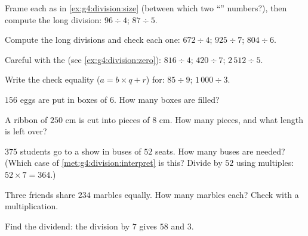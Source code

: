 \begin{exercise}[$\star$]\label{exo:g4:division:1}
Frame each  as in \cref{ex:g4:division:size} (between which
two ``'' numbers?), then compute the long division:
$96 \div 4$; \quad $87 \div 5$.
\end{exercise}

\begin{exercise}[$\star$]\label{exo:g4:division:2}
Compute the long divisions and check each one:
$672 \div 4$; \quad $925 \div 7$; \quad $804 \div 6$.
\end{exercise}

\begin{exercise}[$\star$]\label{exo:g4:division:3}
Careful with the  (see \cref{ex:g4:division:zero}):
$816 \div 4$; \quad $420 \div 7$; \quad $2\,512 \div 5$.
\end{exercise}

\begin{exercise}[$\star$]\label{exo:g4:division:4}
Write the check equality ($a = b \times q + r$) for: $85 \div 9$;
\quad $1\,000 \div 3$.
\end{exercise}

\begin{exercise}[$\star$]\label{exo:g4:division:5}
$156$ eggs are put in boxes of $6$. How many boxes are filled?
\end{exercise}

\begin{exercise}[$\star$]\label{exo:g4:division:6}
A ribbon of $250$ cm is cut into pieces of $8$ cm. How many pieces,
and what length is left over?
\end{exercise}

\begin{exercise}[$\star$]\label{exo:g4:division:7}
$375$ students go to a show in buses of $52$ seats. How many buses
are needed? (Which case of
\cref{met:g4:division:interpret} is this? Divide by $52$ using
multiples: $52 \times 7 = 364$.)
\end{exercise}

\begin{exercise}[$\star$]\label{exo:g4:division:8}
Three friends share $234$ marbles equally. How many marbles each?
Check with a multiplication.
\end{exercise}

\begin{exercise}[$\star$]\label{exo:g4:division:9}
Find the dividend: the division by $7$ gives  $58$ and
 $3$.
\end{exercise}

